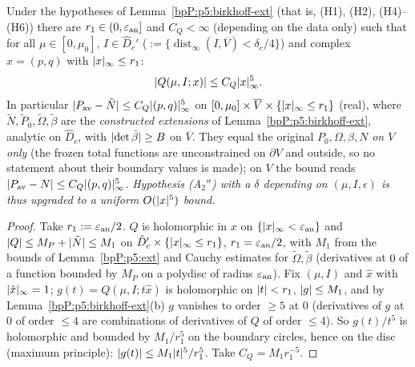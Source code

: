 \begin{proposition}\label{bpP:p5:uniform-remainder}
Under the hypotheses of Lemma~\ref{bpP:p5:birkhoff-ext} (that is, (H1), (H2), (H4)--(H6)) there are $r_1\in(0,\varepsilon_{\rm an}]$ and $C_Q<\infty$ (depending on the data only) such that for all $\mu\in[0,\mu_0]$, $I\in\hat D_c'$ ($:=\{\operatorname{dist}_\infty(I,\overline V)<\delta_c/4\}$) and complex $x=(p,q)$ with $\lvert x\rvert_\infty\le r_1$:
\[\lvert Q(\mu,I;x)\rvert\le C_Q\lvert x\rvert_\infty^5.\]
In particular $\lvert P_{\rm av}-\tilde N\rvert\le C_Q\lvert (p,q)\rvert_\infty^5$ on $[0,\mu_0]\times\overline V\times\{\lvert x\rvert_\infty\le r_1\}$ (real), where $\tilde N,\tilde P_0,\tilde\Omega,\tilde\beta$ are the \emph{constructed extensions} of Lemma~\ref{bpP:p5:birkhoff-ext}, analytic on $\hat D_c$, with $\lvert \det\tilde\beta\rvert\ge B$ on $\overline V$. They equal the original $P_0,\Omega,\beta,N$ \emph{on $V$ only} (the frozen total functions are unconstrained on $\partial V$ and outside, so no statement about their boundary values is made); on $V$ the bound reads $\lvert P_{\rm av}-N\rvert\le C_Q\lvert (p,q)\rvert^5_\infty$. \emph{Hypothesis (A$_2''$) with a $\delta$ depending on $(\mu,I,\epsilon)$ is thus upgraded to a uniform $O(\lvert x\rvert^5)$ bound.}
\end{proposition}
\begin{proof}
\label{stepP:p5:ur-bound} Take $r_1:=\varepsilon_{\rm an}/2$. $Q$ is holomorphic in $x$ on $\{\lvert x\rvert_\infty<\varepsilon_{\rm an}\}$ and $\lvert Q\rvert\le M_P+\lvert \tilde N\rvert\le M_1$ on $\hat D_c'\times\{\lvert x\rvert_\infty\le r_1\}$, $r_1=\varepsilon_{\rm an}/2$, with $M_1$ from the bounds of Lemma~\ref{bpP:p5:ext} and Cauchy estimates for $\tilde\Omega,\tilde\beta$ (derivatives at $0$ of a function bounded by $M_P$ on a polydisc of radius $\varepsilon_{\rm an}$).
\label{stepP:p5:ur-schwarz} Fix $(\mu,I)$ and $\hat x$ with $\lvert \hat x\rvert_\infty=1$; $g(t)=Q(\mu,I;t\hat x)$ is holomorphic on $\lvert t\rvert<r_1$, $\lvert g\rvert\le M_1$, and by Lemma~\ref{bpP:p5:birkhoff-ext}(b) $g$ vanishes to order $\ge5$ at $0$ (derivatives of $g$ at $0$ of order $\le4$ are combinations of derivatives of $Q$ of order $\le4$). So $g(t)/t^5$ is holomorphic and bounded by $M_1/r_1^5$ on the boundary circles, hence on the disc (maximum principle): $\lvert g(t)\rvert\le M_1\lvert t\rvert^5/r_1^5$. Take $C_Q=M_1r_1^{-5}$.
\end{proof}

